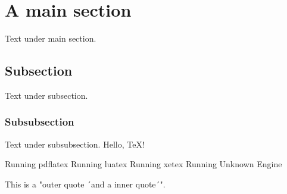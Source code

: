 \documentclass[english,parskip=half,12pt,a4paper]{scrartcl}
\newcommand*{\ta}[1]{\clearpage\section{#1}}
\newcommand*{\tb}[1]{\subsection{#1}}
\newcommand*{\tc}[1]{\subsubsection{#1}}
\begin{document}


\ttitle{}\\
\tsubtitle{}\\
\tversion{}\\

\ta{A main section}
Text under main section.
\tb{Subsection}
Text under subsection.
\tc{Subsubsection}
Text under subsubsection.
Hello, \TeX!

\ifPDFTeX
  Running pdflatex
\else\ifLuaTeX
  Running luatex
\else\ifXeTeX
  Running xetex
\else
  Running Unknown Engine
\fi\fi\fi

This is a "outer quote ´and a inner quote´".

\lipsum[2-4]

\lipsum[6-8]
\end{document}
